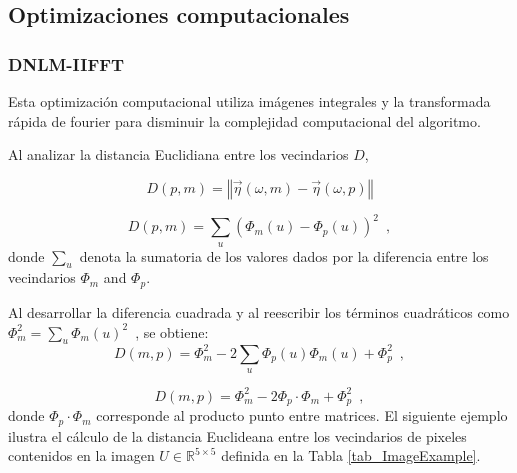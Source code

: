 \subsection{Optimizaciones computacionales}
\label{ch:marco_opt}

\subsubsection{DNLM-IIFFT}
\label{ch:marco_dnlmifft}

Esta optimizaci\'on computacional utiliza im\'agenes integrales y la transformada r\'apida de fourier para disminuir la complejidad computacional del algoritmo. 



Al analizar la distancia Euclidiana entre los vecindarios $D$,

\begin{equation}
D\left(p,m\right)=\left\Vert \vec{\eta}\left(\omega,m\right)-\vec{\eta}\left(\omega,p\right)\right\Vert
\end{equation}

\begin{equation}
D\left(p,m\right)=\sum_{u}\left(\varPhi_{m}\left(u\right)-\varPhi_{p}\left(u\right)\right)^{2} \enspace ,
\end{equation}
 donde $\sum_{u}$ denota la sumatoria de los valores dados por la diferencia entre los vecindarios $\varPhi_m$ and $\varPhi_p$.

Al desarrollar la diferencia cuadrada y al reescribir los t\'erminos cuadr\'aticos como $\varPhi_{m}^{2}=\sum_{u}\varPhi_{m}\left(u\right)^{2} \enspace$,  se obtiene: 
\begin{equation}
 D\left(m,p\right)=\varPhi_{m}^{2}-2\sum_{u}\varPhi_{p}\left(u\right)\varPhi_{m}\left(u\right)+\varPhi_{p}^{2}  \enspace ,
 \label{eq_cuadratica}
\end{equation}


\begin{equation}
D\left(m,p\right)=\varPhi_{m}^{2}-2\varPhi_{p}\cdot\varPhi_{m}+\varPhi_{p}^{2} \enspace ,
\end{equation}
donde $\varPhi_{p}\cdot\varPhi_{m}$ corresponde al producto punto entre matrices. El siguiente ejemplo ilustra el c\'alculo de la distancia Euclideana entre los vecindarios de pixeles contenidos en la imagen $U\in\mathbb{R}^{5\times5}$ definida en la Tabla \ref{tab_ImageExample}.








